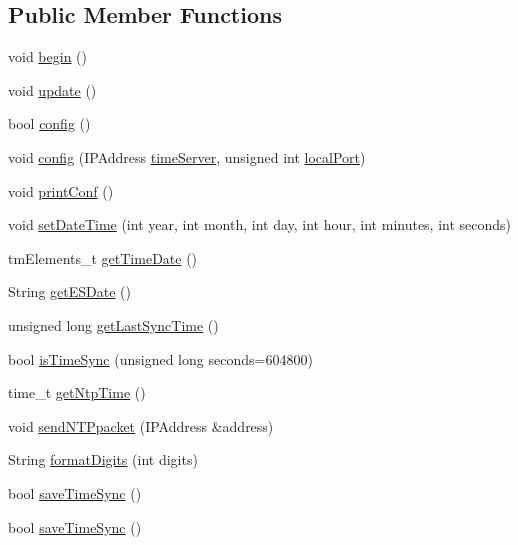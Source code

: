 \subsection*{Public Member Functions}
\begin{DoxyCompactItemize}
\item 
void \hyperlink{classCoolTime_ab1976cf718b950bc31e003c3323b8adb}{begin} ()
\item 
void \hyperlink{classCoolTime_aae601f795452cfa48d9fb337aed483a8}{update} ()
\item 
bool \hyperlink{classCoolTime_a87c28260c1bc77091162cbcf1ee2e129}{config} ()
\item 
void \hyperlink{classCoolTime_a014656d0d3f74d6391364b92b13e0780}{config} (I\+P\+Address \hyperlink{classCoolTime_ad2b9858f399108cb440dd1e908916f04}{time\+Server}, unsigned int \hyperlink{classCoolTime_a2f777da44d7ba678be8185299e9b49d1}{local\+Port})
\item 
void \hyperlink{classCoolTime_af355e7f9b3898211cd2ff25eab5933b1}{print\+Conf} ()
\item 
void \hyperlink{classCoolTime_ab81ea7fdaace111aa01cc1ec84c6d297}{set\+Date\+Time} (int year, int month, int day, int hour, int minutes, int seconds)
\item 
tm\+Elements\+\_\+t \hyperlink{classCoolTime_a7a7501c5ca77dd1248bea704c44f986c}{get\+Time\+Date} ()
\item 
String \hyperlink{classCoolTime_ac4f32ee513c1328d984306645e8785a4}{get\+E\+S\+Date} ()
\item 
unsigned long \hyperlink{classCoolTime_a5d17f707a9d337720493b2bce9d41c21}{get\+Last\+Sync\+Time} ()
\item 
bool \hyperlink{classCoolTime_a5ae038a4498602b189f76a10bf02adf8}{is\+Time\+Sync} (unsigned long seconds=604800)
\item 
time\+\_\+t \hyperlink{classCoolTime_a41fbbbfd651c2079f54d4b2911e4c705}{get\+Ntp\+Time} ()
\item 
void \hyperlink{classCoolTime_a236a38d120dc53bc67456d763838c5a1}{send\+N\+T\+Ppacket} (I\+P\+Address \&address)
\item 
String \hyperlink{classCoolTime_acd537cd4210d7bde4e1f5c47d2ac0456}{format\+Digits} (int digits)
\item 
bool \hyperlink{classCoolTime_ae9658c9b377510d469e3b88edf33ee85}{save\+Time\+Sync} ()
\item 
bool \hyperlink{classCoolTime_ae9658c9b377510d469e3b88edf33ee85}{save\+Time\+Sync} ()
\end{DoxyCompactItemize}
